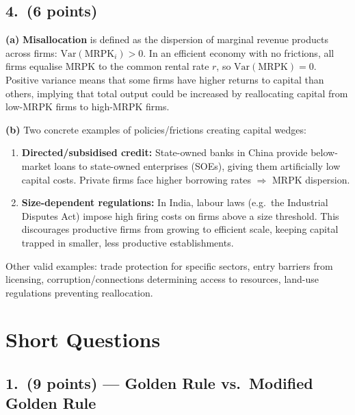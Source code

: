 \documentclass[a4paper,11pt]{article}
\begin{document}
\subsection*{4.\ (6 points)}

\begin{answerbox}
\textbf{(a)} \textbf{Misallocation} is defined as the dispersion of marginal revenue
products across firms: $\text{Var}(\text{MRPK}_i) > 0$.  In an efficient economy with no
frictions, all firms equalise MRPK to the common rental rate $r$, so
$\text{Var}(\text{MRPK}) = 0$.  Positive variance means that some firms have higher
returns to capital than others, implying that total output could be increased by
reallocating capital from low-MRPK firms to high-MRPK firms.

\textbf{(b)} Two concrete examples of policies/frictions creating capital wedges:
\begin{enumerate}[label=(\roman*)]
    \item \textbf{Directed/subsidised credit:} State-owned banks in China provide
    below-market loans to state-owned enterprises (SOEs), giving them artificially low
    capital costs.  Private firms face higher borrowing rates $\Rightarrow$ MRPK dispersion.
    \item \textbf{Size-dependent regulations:} In India, labour laws (e.g.\ the Industrial
    Disputes Act) impose high firing costs on firms above a size threshold.  This
    discourages productive firms from growing to efficient scale, keeping capital trapped
    in smaller, less productive establishments.
\end{enumerate}

Other valid examples: trade protection for specific sectors, entry barriers from
licensing, corruption/connections determining access to resources, land-use regulations
preventing reallocation.
\end{answerbox}

\clearpage
\section{Short Questions}

\subsection*{1.\ (9 points) --- Golden Rule vs.\ Modified Golden Rule}
\end{document}
